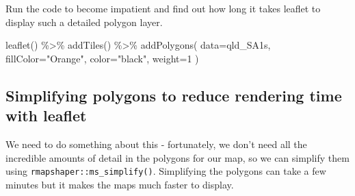 \documentclass[
]{book}
\newenvironment{Shaded}{\begin{snugshade}}{\end{snugshade}}
\newcommand{\AttributeTok}[1]{\textcolor[rgb]{0.77,0.63,0.00}{#1}}
\newcommand{\DecValTok}[1]{\textcolor[rgb]{0.00,0.00,0.81}{#1}}
\newcommand{\FunctionTok}[1]{\textcolor[rgb]{0.00,0.00,0.00}{#1}}
\newcommand{\NormalTok}[1]{#1}
\newcommand{\SpecialCharTok}[1]{\textcolor[rgb]{0.00,0.00,0.00}{#1}}
\newcommand{\StringTok}[1]{\textcolor[rgb]{0.31,0.60,0.02}{#1}}
\begin{document}
Run the code to become impatient and find out how long it takes leaflet to display such a detailed polygon layer.

\begin{Shaded}
\begin{Highlighting}[]
\FunctionTok{leaflet}\NormalTok{() }\SpecialCharTok{\%\textgreater{}\%}
  \FunctionTok{addTiles}\NormalTok{() }\SpecialCharTok{\%\textgreater{}\%}
  \FunctionTok{addPolygons}\NormalTok{(}
    \AttributeTok{data=}\NormalTok{qld\_SA1s,}
    \AttributeTok{fillColor=}\StringTok{"Orange"}\NormalTok{,}
    \AttributeTok{color=}\StringTok{"black"}\NormalTok{,}
    \AttributeTok{weight=}\DecValTok{1}
\NormalTok{  )}
\end{Highlighting}
\end{Shaded}

\hypertarget{simplifying-polygons-to-reduce-rendering-time-with-leaflet}{%
\subsection{Simplifying polygons to reduce rendering time with leaflet}\label{simplifying-polygons-to-reduce-rendering-time-with-leaflet}}

We need to do something about this - fortunately, we don't need all the incredible amounts of detail in the polygons for our map, so we can simplify them using \texttt{rmapshaper::ms\_simplify()}.
Simplifying the polygons can take a few minutes but it makes the maps much faster to display.
\end{document}
